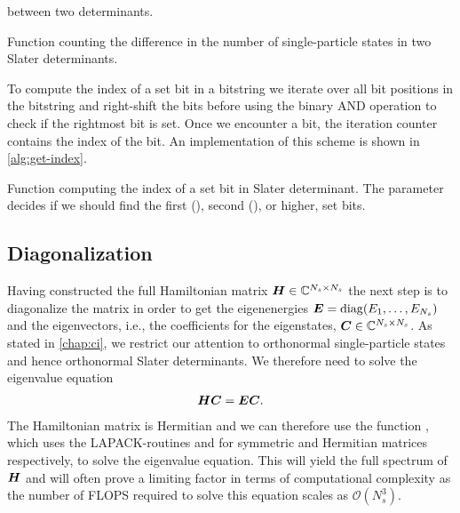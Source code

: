             between two determinants.
            \begin{algorithm}
                \caption{Function counting the difference in the number of
                single-particle states in two Slater determinants.}
                \label{alg:state-diff}
            \end{algorithm}
            To compute the index of a set bit in a bitstring we iterate over all
            bit positions in the bitstring and right-shift the bits before using
            the binary AND operation to check if the rightmost bit is set.
            Once we encounter a bit, the iteration counter contains the index of
            the bit.
            An implementation of this scheme is shown in
            \autoref{alg:get-index}.
            \begin{algorithm}
                \caption{Function computing the index of a set bit in Slater
                determinant.
                The parameter  decides if we should find the
                first (), second (), or higher, set bits.}
                \label{alg:get-index}
            \end{algorithm}


        \subsection{Diagonalization}
            Having constructed the full Hamiltonian matrix $\boldsymbol{H} \in
            \mathbb{C}^{N_s \times N_s}$ the next step is to diagonalize the
            matrix in order to get the eigenenergies $\boldsymbol{E} = \operatorname{diag}(E_1,
            \dots, E_{N_s})$ and the eigenvectors, i.e., the coefficients for
            the eigenstates, $\boldsymbol{C} \in \mathbb{C}^{N_s \times N_s}$.
            As stated in \autoref{chap:ci}, we restrict our attention to
            orthonormal single-particle states and hence orthonormal Slater
            determinants.
            We therefore need to solve the eigenvalue equation
            \begin{align}
                \boldsymbol{H}\boldsymbol{C} = \boldsymbol{E}\boldsymbol{C}.
            \end{align}
            The Hamiltonian matrix is Hermitian and we can therefore use the
            function  \cite{numpy}, which uses the
            LAPACK-routines \cite{laug}  and  for
            symmetric and Hermitian matrices respectively, to solve the
            eigenvalue equation.
            This will yield the full spectrum of $\boldsymbol{H}$ and will often
            prove a limiting factor in terms of computational complexity as the
            number of FLOPS required to solve this equation scales as
            $\mathcal{O}(N_s^3)$.

